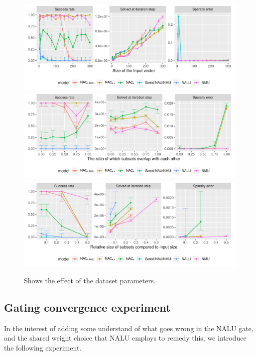 \begin{figure}[h]
\centering
\includegraphics[width=\linewidth,trim={0 1.3cm 0 0},clip]{results/simple_function_static_mul_input_size.pdf}
\includegraphics[width=\linewidth,trim={0 1.3cm 0 0.809cm},clip]{results/simple_function_static_mul_overlap.pdf}
\includegraphics[width=\linewidth,trim={0 0 0 0.809cm},clip]{results/simple_function_static_mul_subset.pdf}
\caption{Shows the effect of the dataset parameters.}
\label{fig:simple-function-static-dataset-parameters-boundary}
\end{figure}

\subsection{Gating convergence experiment}
\label{sec:appendix:nalu-gate-experiment}

In the interest of adding some understand of what goes wrong in the NALU gate, and the shared weight choice that NALU employs to remedy this, we introduce the following experiment.

